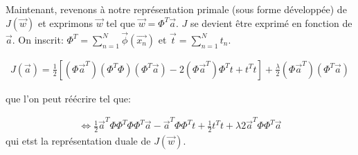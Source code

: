 Maintenant, revenons à notre représentation primale (sous forme développée) de $J(\overrightarrow{w})$ et exprimons $\overrightarrow{w}$ tel que $\overrightarrow{w} = \Phi^T \overrightarrow{a}$. 
$J$ se devient être exprimé en fonction de $\overrightarrow{a}$. On inscrit: $\Phi^T = \sum_{n=1}^N \overrightarrow{\phi}(\overrightarrow{x_n}) $ et $\overrightarrow{t} = \sum_{n=1}^Nt_n$.

\begin{equation}
\begin{split}
	J(\overrightarrow{a}) = \frac{1}{2} \left[(\Phi \overrightarrow{a}^T)(\Phi^T \Phi)(\Phi^T \overrightarrow{a}) - 2 (\Phi \overrightarrow{a}^T)\Phi^T t + t^T t \right] + \frac{\lambda}{2} (\Phi \overrightarrow{a}^T) (\Phi^T \overrightarrow{a})
\end{split}
\end{equation}

que l'on peut réécrire tel que:

\begin{equation}
\begin{split}
	\iff \frac{1}{2} \overrightarrow{a}^T \Phi \Phi^T \Phi \Phi^T \overrightarrow{a} - \overrightarrow{a}^T \Phi \Phi^T  t + \frac{1}{2} t^T t + {\lambda}{2} \overrightarrow{a}^T \Phi \Phi^T \overrightarrow{a}
\end{split}
\end{equation}
qui etst la représentation duale de $J(\overrightarrow{w})$.